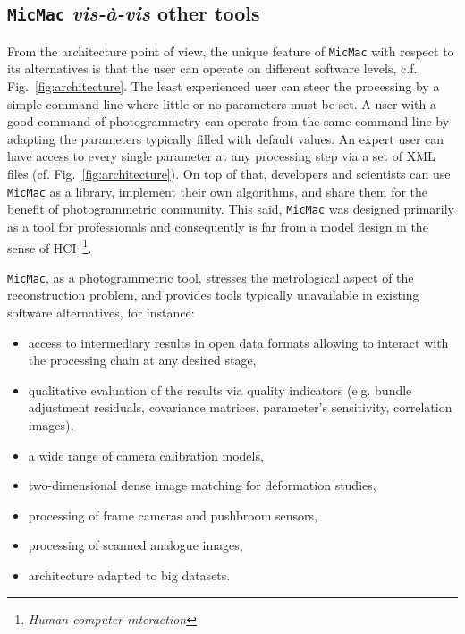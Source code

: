 \documentclass[twocolumn]{bmcart}%
\begin{document}
\subsection*{{\tt MicMac} \textit{vis-à-vis} other tools}
From the architecture point of view, the unique feature of {\tt MicMac} with respect to its alternatives is that the user can operate on different software {levels}, c.f. Fig.~\ref{fig:architecture}. The least experienced user can steer the processing by a simple command line where little or no parameters must be set. A user with a good command of photogrammetry can operate from the same command line by adapting the parameters typically filled with default values. An expert user can have access to every single parameter at any processing step via a set of XML files (cf. Fig.~\ref{fig:architecture}). On top of that, developers and scientists can use {\tt MicMac} as a library, implement their own algorithms, and share them for the benefit of photogrammetric community. This said, {\tt MicMac} was designed primarily as a tool for professionals and consequently is far from a model design in the sense of HCI~\footnote{\textit{Human-computer interaction}}.\par 
%
{\tt MicMac}, as a photogrammetric tool, stresses the metrological aspect of the reconstruction problem, and provides tools typically unavailable in existing software alternatives, for instance:
\begin{itemize}
\item access to intermediary results in open data formats allowing to interact with the processing chain at any desired stage,
\item qualitative evaluation of the results via quality indicators (e.g. bundle adjustment residuals, covariance matrices, parameter's sensitivity, correlation images),
\item a wide range of camera calibration models,
\item two-dimensional dense image matching for deformation studies,
\item processing of frame cameras and pushbroom sensors,
\item processing of scanned analogue images,
\item architecture adapted to big datasets.
\end{itemize}
%
%
\end{document}
